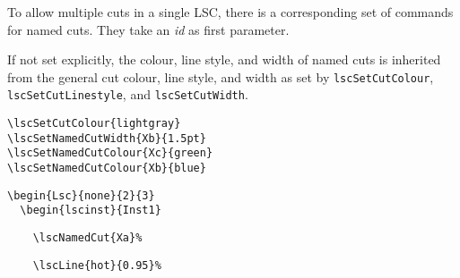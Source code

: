 \documentclass{article}
\newcommand{\bs}{\usebox{\bsbox}}
\newcommand{\cmd}[1]{\bs\texttt{#1}}
\newcommand{\mlscSetCutColour}{\cmd{lscSetCutColour}}
\newcommand{\mlscSetCutLinestyle}{\cmd{lscSetCutLinestyle}}
\newcommand{\mlscSetCutWidth}{\cmd{lscSetCutWidth}}
\newcommand{\var}[1]{\textit{#1}}
\begin{document}
To allow 
multiple cuts in a single LSC, there is a corresponding set of commands for
named cuts.
%
They take an \var{id} as first parameter.

If not set explicitly, the colour, line style, and width of named cuts is
inherited from the general cut colour, line style, and width as set by
\mlscSetCutColour{}, \mlscSetCutLinestyle{}, and \mlscSetCutWidth{}.

\begin{center}%
\begin{minipage}{0.45\textwidth}%
\end{minipage}%
\hfill%
\begin{minipage}{0.45\textwidth}%
\small%
{\begin{verbatim}
\lscSetCutColour{lightgray}
\lscSetNamedCutWidth{Xb}{1.5pt}
\lscSetNamedCutColour{Xc}{green}
\lscSetNamedCutColour{Xb}{blue}
\end{verbatim}}%
\verbunskip%
{\gray\begin{verbatim}
\begin{Lsc}{none}{2}{3}
  \begin{lscinst}{Inst1}
\end{verbatim}}%
\verbunskip%
{\begin{verbatim}
    \lscNamedCut{Xa}%
\end{verbatim}}%
\verbunskip%
{\gray\begin{verbatim}
    \lscLine{hot}{0.95}%
\end{verbatim}}%

\end{minipage}
\end{center}
\end{document}
